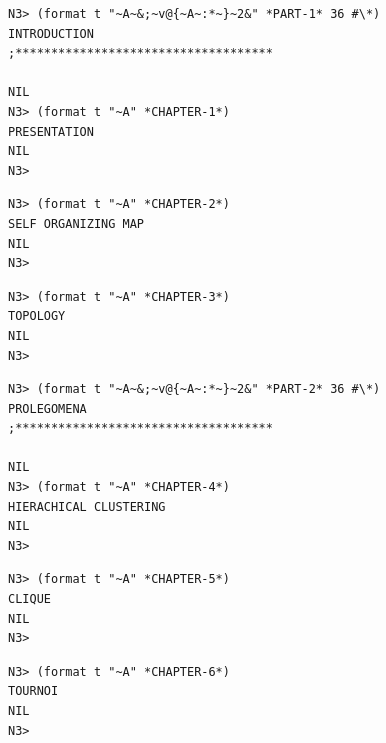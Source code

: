 \documentclass{article}
\begin{document}
\bigskip
\bigskip
\renewcommand*\listfigurename{List of figures}
\listoffigures

\bigskip
\bigskip
\renewcommand*{\listtablename}{List of tables}
\listoftables

\bigskip
\bigskip
\bigskip

\begin{lstlisting}[language=sectitle]
N3> (format t "~A~&;~v@{~A~:*~}~2&" *PART-1* 36 #\*)
INTRODUCTION
;************************************

NIL
N3> (format t "~A" *CHAPTER-1*)
PRESENTATION
NIL
N3> 
\end{lstlisting}
{}

\bigskip

\bigskip
\bigskip

\begin{lstlisting}[language=sectitle]
N3> (format t "~A" *CHAPTER-2*)
SELF ORGANIZING MAP
NIL
N3> 
\end{lstlisting}

\bigskip

\newpage

\begin{lstlisting}[language=sectitle]
N3> (format t "~A" *CHAPTER-3*)
TOPOLOGY
NIL
N3> 
\end{lstlisting}
\label{topology}

\bigskip

\bigskip
\bigskip

\begin{lstlisting}[language=sectitle]
N3> (format t "~A~&;~v@{~A~:*~}~2&" *PART-2* 36 #\*)
PROLEGOMENA
;************************************

NIL
N3> (format t "~A" *CHAPTER-4*)
HIERACHICAL CLUSTERING
NIL
N3> 
\end{lstlisting}
{}

\bigskip

\bigskip
\bigskip

\begin{lstlisting}[language=sectitle]
N3> (format t "~A" *CHAPTER-5*)
CLIQUE
NIL
N3> 
\end{lstlisting}

\bigskip

\bigskip
\bigskip

\begin{lstlisting}[language=sectitle]
N3> (format t "~A" *CHAPTER-6*)
TOURNOI
NIL
N3> 
\end{lstlisting}
\end{document}
